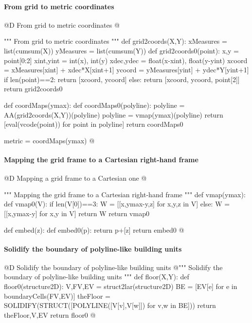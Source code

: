 \documentclass[11pt,oneside]{article}    %
\begin{document}
\paragraph{From grid to metric coordinates}
@D From grid to metric coordinates
@{""" From grid to metric coordinates """
def grid2coords(X,Y):
    xMeasures = list(cumsum(X))
    yMeasures = list(cumsum(Y))
    def grid2coords0(point):
        x,y = point[0:2]
        xint,yint = int(x), int(y)
        xdec,ydec = float(x-xint), float(y-yint)
        xcoord = xMeasures[xint] + xdec*X[xint+1]
        ycoord = yMeasures[yint] + ydec*Y[yint+1]
        if len(point)==2: return [xcoord, ycoord]
        else: return [xcoord, ycoord, point[2]]
    return grid2coords0

def coordMaps(ymax):
    def coordMaps0(polyline):
        polyline = AA(grid2coords(X,Y))(polyline)
        polyline = vmap(ymax)(polyline)
        return [eval(vcode(point)) for point in polyline]
    return coordMaps0

metric = coordMaps(ymax)
@}
\paragraph{Mapping the grid frame to a Cartesian right-hand frame}
@D Mapping a grid frame to a Cartesian one
@{""" Mapping the grid frame to a Cartesian right-hand frame """
def vmap(ymax):
    def vmap0(V):
        if len(V[0])==3: W = [[x,ymax-y,z] for x,y,z in V]
        else: W = [[x,ymax-y] for x,y in V]
        return W
    return vmap0
                
def embed(z):
    def embed0(p): 
        return p+[z]
    return embed0
@}

\paragraph{Solidify the boundary of polyline-like building units}
@D Solidify the boundary of polyline-like building units
@{""" Solidify the boundary of polyline-like building units """
def floor(X,Y):
    def floor0(structure2D):
        V,FV,EV = struct2lar(structure2D)
        BE = [EV[e] for e in boundaryCells(FV,EV)]
        theFloor = SOLIDIFY(STRUCT([POLYLINE([V[v],V[w]]) for v,w in BE]))
        return theFloor,V,EV
    return floor0
@}
\end{document}
